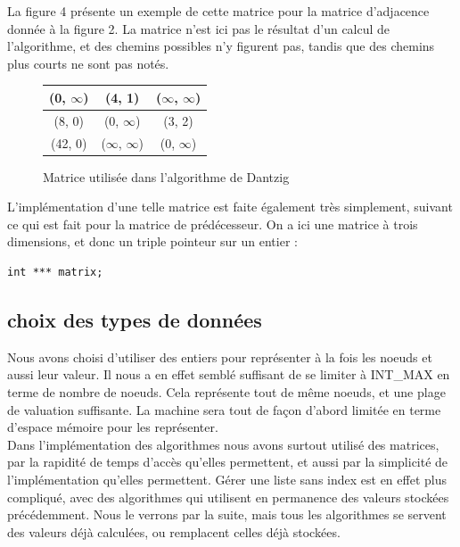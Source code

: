 \documentclass[a4paper,12pt,final] {article}
\begin{document}
La figure 4 présente un exemple de cette matrice pour la matrice d'adjacence donnée à la figure 2. La matrice n'est ici pas le résultat d'un calcul de l'algorithme, et des chemins possibles n'y figurent pas, tandis que des chemins plus courts ne sont pas notés.\\ %

\begin{figure}[htdp]
\begin{center}
\begin{tabular}{|c|c|c|}
\hline
(0, $\infty$) & (4, 1) & ($\infty$, $\infty$) \\
\hline
(8, 0) & (0, $\infty$) & (3, 2)\\
\hline
(42, 0) & ($\infty$, $\infty$) & (0, $\infty$)\\ 
\hline
\end{tabular}
\end{center}
\caption{Matrice utilisée dans l'algorithme de Dantzig}
\end{figure}

L'implémentation d'une telle matrice est faite également très simplement, suivant ce qui est fait pour la matrice de prédécesseur. On a ici une matrice à trois dimensions, et donc un triple pointeur sur un entier :
\begin{lstlisting}
int *** matrix;
\end{lstlisting}

\subsection{choix des types de données}

Nous avons choisi d'utiliser des entiers pour représenter à la fois les noeuds et aussi leur valeur. Il nous a en effet semblé suffisant de se limiter à INT\_MAX en terme de nombre de noeuds. Cela représente tout de même  noeuds, et une plage de valuation suffisante. La machine sera tout de façon d'abord limitée en terme d'espace mémoire pour les représenter.\\

Dans l'implémentation des algorithmes nous avons surtout utilisé des matrices, par la rapidité de temps d'accès qu'elles permettent, et aussi par la simplicité de l'implémentation qu'elles permettent. Gérer une liste sans index est en effet plus compliqué, avec des algorithmes qui utilisent en permanence des valeurs stockées précédemment. Nous le verrons par la suite, mais tous les algorithmes se servent des valeurs déjà calculées, ou remplacent celles déjà stockées.\\
\end{document}
